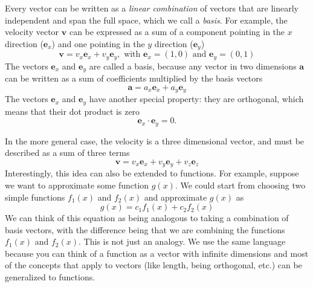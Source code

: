 \documentclass[../Main/chem371-notes.tex]{subfiles}
\begin{document}
Every vector can be written as a \emph{linear combination} of vectors that are linearly independent and span the full space, which we call a \emph{basis}.
For example, the velocity vector $\mathbf{v}$ can be expressed as a sum of a component pointing in the $x$ direction ($\mathbf{e}_x$) and one pointing in the $y$ direction ($\mathbf{e}_y$)
\begin{equation}
\mathbf{v} = v_x \mathbf{e}_x + v_y \mathbf{e}_y, \text{ with } \mathbf{e}_x = (1,0) \text{ and } \mathbf{e}_y = (0,1)
\end{equation}
The vectors $\mathbf{e}_x$ and $\mathbf{e}_y$ are called a basis, because any vector in two dimensions $\mathbf{a}$ can be written as a sum of coefficients multiplied by the basis vectors
\begin{equation}
\mathbf{a} = a_x \mathbf{e}_x + a_y \mathbf{e}_y
\end{equation}
The vectors $\mathbf{e}_x$ and $\mathbf{e}_y$ have another special property: they are orthogonal, which means that their dot product is zero
\begin{equation}
 \mathbf{e}_x \cdot \mathbf{e}_y = 0.
\end{equation}

In the more general case, the velocity is a three dimensional vector, and must be described as a sum of three terms
\begin{equation}
\mathbf{v} = v_x \mathbf{e}_x + v_y \mathbf{e}_y + v_z \mathbf{e}_z
\end{equation}
Interestingly, this idea can also be extended to functions.
For example, suppose we want to approximate some function $g(x)$.
We could start from choosing two simple functions $f_1(x)$ and $f_2(x)$ and approximate $g(x)$ as
\begin{equation}
\label{eq:fit_simple}
g(x) = c_1 f_1(x) + c_2 f_2(x)
\end{equation}
We can think of this equation as being analogous to taking a combination of basis vectors, with the difference being that we are combining the functions $f_1(x)$ and $f_2(x)$.
This is not just an analogy. We use the same language because you can think of a function as a vector with infinite dimensions and most of the concepts that apply to vectors (like length, being orthogonal, etc.) can be generalized to functions. 
\end{document}
